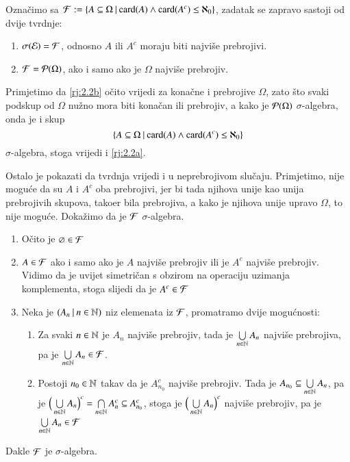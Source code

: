 \begin{rj}[\ref{zad:2.2}]
    Ozna\v cimo sa $\mathcal{F} := \{{A \subseteq \Omega} \: | \: {\mathrm{card}({A}) \land \mathrm{card}({A^c}) \leq \aleph_0}\}$,
    zadatak se zapravo sastoji od dvije tvrdnje:
    \begin{enumerate}[label=(\arabic*)]
        \item \label{rj:2.2a}
        $\sigma({\mathcal{E}}) = \mathcal{F}$, odnosno $A$ ili $A^c$ moraju biti najvi\v se prebrojivi.
        \item   \label{rj:2.2b}
        $\mathcal{F} = \mathcal{P}({\Omega})$, ako i samo ako je $\Omega$ najvi\v se prebrojiv.
    \end{enumerate}
    Primjetimo da \ref{rj:2.2b} o\v cito vrijedi za kona\v cne i prebrojive $\Omega$, zato \v sto svaki podskup od $\Omega$ nu\v zno mora biti kona\v can ili prebrojiv, a kako je $\mathcal{P}({\Omega})$ $\sigma$-algebra, onda je i skup
    \begin{equation*}
        \{{A \subseteq \Omega} \: | \: {\mathrm{card}({A}) \land \mathrm{card}({A^c}) \leq \aleph_0}\}
    \end{equation*}
    $\sigma$-algebra, stoga vrijedi i \ref{rj:2.2a}.

    Ostalo je pokazati da tvrdnja vrijedi i u neprebrojivom slu\v caju.
    Primjetimo, nije mogu\' ce da su $A$ i $A^c$ oba prebrojivi, jer bi tada njihova unije kao unija prebrojivih skupova, tako\dj er bila prebrojiva, a kako je njihova unije upravo $\Omega$, to nije mogu\' ce.
    Doka\v zimo da je $\mathcal{F}$ $\sigma$-algebra.
    \begin{enumerate}[label=(\roman*)]
        \item O\v cito je $\varnothing \in \mathcal{F}$
        \item $A \in \mathcal{F}$ ako i samo ako je $A$ najvi\v se prebrojiv ili je $A^c$ najvi\v se prebrojiv.
        Vidimo da je uvijet simetri\v can s obzirom na operaciju uzimanja komplementa, stoga slijedi da je $A^c \in \mathcal{F}$
        \item Neka je $({A_n} \: | \: {n \in \mathbb{N}})$ niz elemenata iz $\mathcal{F}$, promatramo dvije mogu\' cnosti:
        \begin{enumerate}[label=\arabic*$\degree$)]
            \item Za svaki $n \in \mathbb{N}$ je $A_n$ najvi\v se prebrojiv, tada je $\bigcup\limits_{n \in \mathbb{N}}^{} A_n$ najvi\v se prebrojiva, pa je $\bigcup\limits_{n \in \mathbb{N}}^{} A_n \in \mathcal{F}$.
            \item Postoji $n_0 \in \mathbb{N}$ takav da je $A_{n_0}^c$ najvi\v se prebrojiv.
            Tada je $A_{n_0} \subseteq \bigcup\limits_{n \in \mathbb{N}}^{} A_n$, pa je $\Big( \bigcup\limits_{n \in \mathbb{N}}^{} A_n \Big)^c = \bigcap\limits_{n \in \mathbb{N}}^{} A_n^c \subseteq A_{n_0}^c$, stoga je $\Big( \bigcup\limits_{n \in \mathbb{N}}^{} A_n \Big)^c$ najvi\v se prebrojiv, pa je $\bigcup\limits_{n \in \mathbb{N}}^{} A_n \in \mathcal{F}$
        \end{enumerate}
    \end{enumerate}
    Dakle $\mathcal{F}$ je $\sigma$-algebra.


\end{rj}
